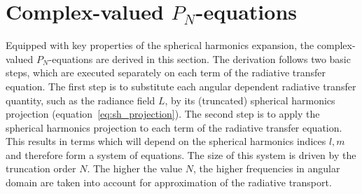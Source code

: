\section{Complex-valued $P_N$-equations}
\label{sec:pn_cvalued}

Equipped with key properties of the spherical harmonics expansion, the complex-valued $P_N$-equations are derived in this section. The derivation follows two basic steps, which are executed separately on each term of the radiative transfer equation. The first step is to substitute each angular dependent radiative transfer quantity, such as the radiance field $L$, by its (truncated) spherical harmonics projection (equation~\ref{eq:sh_projection}). The second step is to apply the spherical harmonics projection to each term of the radiative transfer equation. This results in terms which will depend on the spherical harmonics indices $l,m$ and therefore form a system of equations. The size of this system is driven by the truncation order $N$. The higher the value $N$, the higher frequencies in angular domain are taken into account for approximation of the radiative transport.
